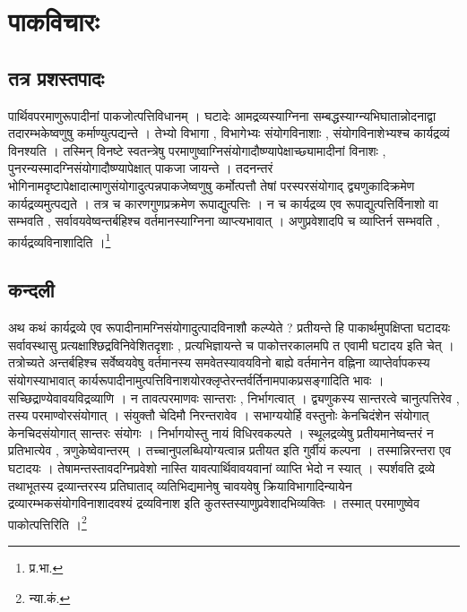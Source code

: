 \chapter{पाकविचारः}

\section{तत्र प्रशस्तपादः}
पार्थिवपरमाणुरूपादीनां पाकजोत्पत्तिविधानम् । घटादेः आमद्रव्यस्याग्निना सम्बद्धस्याग्न्यभिघातान्नोदनाद्वा तदारम्भकेष्वणुषु कर्माण्युत्पद्यन्ते । तेभ्यो विभागा , विभागेभ्यः संयोगविनाशाः , संयोगविनाशेभ्यश्च कार्यद्रव्यं विनश्यति । तस्मिन् विनष्टे स्वतन्त्रेषु परमाणुष्वाग्निसंयोगादौष्ण्यापेक्षाच्छ्यामादीनां विनाशः , पुनरन्यस्मादग्निसंयोगादौष्ण्यापेक्षात् पाकजा जायन्ते । तदनन्तरं भोगिनामदृष्टापेक्षादात्माणुसंयोगादुत्पन्नपाकजेष्वणुषु कर्मोत्पत्तौ तेषां परस्परसंयोगाद् द्व्यणुकादिक्रमेण कार्यद्रव्यमुत्पद्यते । तत्र च कारणगुणप्रक्रमेण रूपाद्युत्पत्तिः ।  न च कार्यद्रव्य एव रूपाद्युत्पत्तिर्विनाशो वा सम्भवति , सर्वावयवेष्वन्तर्बहिश्च वर्तमानस्याग्निना व्याप्त्यभावात् । अणुप्रवेशादपि च व्याप्तिर्न सम्भवति , कार्यद्रव्यविनाशादिति ।\footnote{प्र.भा.}

\section{कन्दली}
अथ कथं कार्यद्रव्ये एव रूपादीनामग्निसंयोगादुत्पादविनाशौ कल्प्येते ? प्रतीयन्ते हि पाकार्थमुपक्षिप्ता घटादयः सर्वावस्थासु प्रत्यक्षाश्छिद्रविनिवेशितदृशाः , प्रत्यभिज्ञायन्ते च पाकोत्तरकालमपि त एवामी घटादय इति चेत् । तत्रोच्यते अन्तर्बहिश्च सर्वेष्वयवेषु वर्तमानस्य समवेतस्यावयविनो बाह्ये वर्तमानेन  वह्निना व्याप्तेर्वापकस्य संयोगस्याभावात् कार्यरूपादीनामुत्पत्तिविनाशयोरक्लृप्तेरन्तर्वर्तिनामपाकप्रसङ्गादिति भावः । सच्छिद्राण्येवावयविद्रव्याणि । न तावत्परमाणवः सान्तराः , निर्भागत्वात् । द्व्यणुकस्य सान्तरत्वे चानुत्पत्तिरेव , तस्य परमाण्वोरसंयोगात् । संयुक्तौ चेदिमौ निरन्तरावेव । सभाग्ययोर्हि वस्तुनोः केनचिदंशेन संयोगात् केनचिदसंयोगात् सान्तरः संयोगः । निर्भागयोस्तु नायं विधिरवकल्पते । स्थूलद्रव्येषु प्रतीयमानेष्वन्तरं न प्रतिभात्येव , त्रणुकेष्वेवान्तरम् । तच्चानुपलब्धियोग्यत्वान्न प्रतीयत इति गुर्वीयं कल्पना । तस्मान्निरन्तरा एव घटादयः । तेषामन्तस्तावदग्निप्रवेशो नास्ति यावत्पार्थिवावयवानां व्याप्ति भेदो न स्यात् । स्पर्शवति द्रव्ये तथाभूतस्य द्रव्यान्तरस्य प्रतिघाताद् व्यतिभिद्यमानेषु चावयवेषु क्रियाविभागादिन्यायेन द्रव्यारम्भकसंयोगविनाशादवश्यं द्रव्यविनाश इति कुतस्तस्याणुप्रवेशादभिव्यक्तिः । तस्मात् परमाणुष्वेव पाकोत्पत्तिरिति ।\footnote{न्या.कं.}

